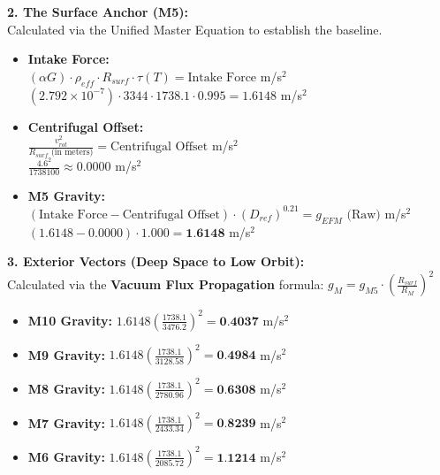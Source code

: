 \documentclass[11pt, a4paper]{article}
\begin{document}
  \vspace{1.0em}
  \noindent \textbf{2. The Surface Anchor (M5):} \\
  \hspace*{1em} Calculated via the Unified Master Equation to establish the baseline.
  \begin{itemize}
    \item \textbf{Intake Force:} \\[0.5em]
    \hspace*{2em} $(\alpha G) \cdot \rho_{eff} \cdot R_{surf} \cdot \tau(T) = \text{Intake Force}$ m/s$^2$ \\[1em]
    \hspace*{2em} $(2.792 \times 10^{-7}) \cdot 3344 \cdot 1738.1 \cdot 0.995 = 1.6148$ m/s$^2$
    
    \item \textbf{Centrifugal Offset:} \\[0.5em]
    \hspace*{2em} $\frac{v_{rot}^2}{R_{surf} \text{ (in meters)}} = \text{Centrifugal Offset}$ m/s$^2$ \\[1em]
    \hspace*{2em} $\frac{4.6^2}{1738100} \approx 0.0000$ m/s$^2$
    
    \item \textbf{M5 Gravity:} \\[0.5em]
    \hspace*{2em} $(\text{Intake Force} - \text{Centrifugal Offset}) \cdot (D_{ref})^{0.21} = g_{EFM} \text{ (Raw)}$ m/s$^2$ \\[1em]
    \hspace*{2em} $(1.6148 - 0.0000) \cdot 1.000 = \textbf{1.6148}$ m/s$^2$
  \end{itemize}

  \clearpage
  \noindent \textbf{3. Exterior Vectors (Deep Space to Low Orbit):} \\
  \hspace*{1em} Calculated via the \textbf{Vacuum Flux Propagation} formula: $g_M = g_{M5} \cdot \left( \frac{R_{surf}}{R_M} \right)^2$
  \begin{itemize}
    \item \textbf{M10 Gravity:} $1.6148 \left( \frac{1738.1}{3476.2} \right)^2 = \textbf{0.4037}$ m/s$^2$
    \item \textbf{M9 Gravity:} $1.6148 \left( \frac{1738.1}{3128.58} \right)^2 = \textbf{0.4984}$ m/s$^2$
    \item \textbf{M8 Gravity:} $1.6148 \left( \frac{1738.1}{2780.96} \right)^2 = \textbf{0.6308}$ m/s$^2$
    \item \textbf{M7 Gravity:} $1.6148 \left( \frac{1738.1}{2433.34} \right)^2 = \textbf{0.8239}$ m/s$^2$
    \item \textbf{M6 Gravity:} $1.6148 \left( \frac{1738.1}{2085.72} \right)^2 = \textbf{1.1214}$ m/s$^2$
  \end{itemize}
\end{document}
